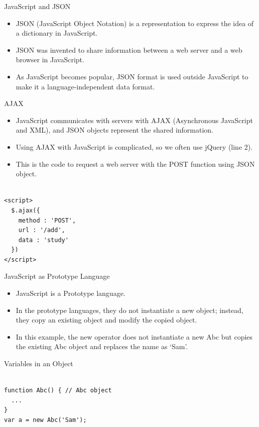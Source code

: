 \begin{frame}[fragile]{JavaScript and JSON}

\begin{itemize}
	\item JSON (JavaScript Object Notation) is a representation to express the idea of a dictionary in JavaScript. 
	\item JSON was invented to share information between a web server and a web browser in JavaScript. 
	\item As JavaScript becomes popular, JSON format is used outside JavaScript to make it a language-independent data format. 
\end{itemize}

\end{frame}

\begin{frame}[fragile]{AJAX}

\begin{itemize}
	\item JavaScript communicates with servers with AJAX (Asynchronous JavaScript and XML), and JSON objects represent the shared information. 
	\item Using AJAX with JavaScript is complicated, so we often use jQuery (line 2). 
	\item This is the code to request a web server with the POST function using JSON object.
\end{itemize}

\begin{Code}{}%
\begin{lstlisting}[firstnumber=1, label=glabels, xleftmargin=0pt, basicstyle=\tiny]% 

<script>
  $.ajax({
    method : 'POST',
    url : '/add',
    data : 'study'
  })
</script>
\end{lstlisting}%
\end{Code}%

\end{frame}

\begin{frame}[fragile]{JavaScript as Prototype Language}

\begin{itemize}
	\item JavaScript is a Prototype language. 
	\item In the prototype languages, they do not instantiate a new object; instead, they copy an existing object and modify the copied object. 
	\item In this example, the new operator does not instantiate a new Abc but copies the existing Abc object and replaces the name as `Sam'.
\end{itemize}

\begin{Code}{Variables in an Object}%
\begin{lstlisting}[firstnumber=1, label=glabels, xleftmargin=0pt, basicstyle=\scriptsize]% 

function Abc() { // Abc object 
  ... 
}
var a = new Abc('Sam'); 
\end{lstlisting}%
\end{Code}%
\end{frame}

